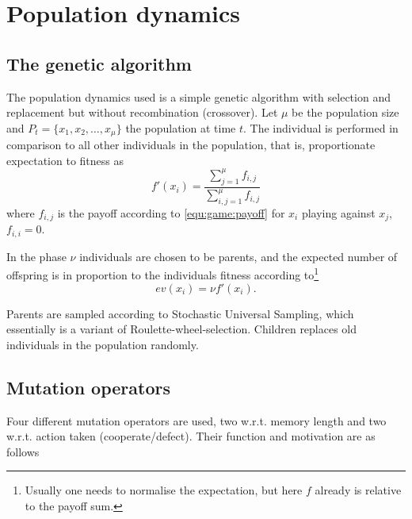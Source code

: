 \section{Population dynamics}\label{sec:genetic}

\subsection{The genetic algorithm}
The population dynamics used is a simple genetic algorithm with selection and replacement but without recombination (crossover). Let $\mu$ be the population size and $P_{t} = \{x_1, x_2, \dots, x_\mu\}$ the population at time $t$. The individual  is performed in comparison to all other individuals in the population, that is, proportionate expectation to fitness as
\begin{equation*}
f'(x_i) = \frac{\sum_{j = 1}^\mu f_{i,j}}{\sum_{i,j = 1}^\mu f_{i, j}}
\end{equation*}
where $f_{i, j}$ is the payoff according to \ref{equ:game:payoff} for $x_i$ playing against $x_j$, $f_{i,i} = 0$.


In the  phase $\nu$ individuals are chosen to be parents, and the expected number of offspring is in proportion to the individuals fitness according to\footnote{Usually one needs to normalise the expectation, but here $f$ already is relative to the payoff sum.}
\begin{equation*}
ev(x_i) = \nu f'(x_i).
\end{equation*}

Parents are sampled according to
Stochastic Universal Sampling, %
which essentially is a variant of Roulette-wheel-selection. Children
replaces old individuals in the population randomly.


\subsection{Mutation operators}
Four different mutation operators are used, two w.r.t. memory length and two w.r.t. action taken (cooperate/defect). Their function and motivation are as follows

